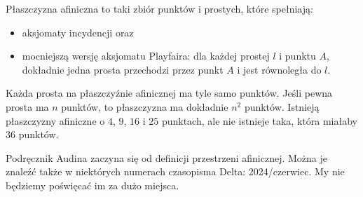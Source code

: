\begin{proposition}
    Płaszczyzna afiniczna to taki zbiór punktów i prostych, które spełniają: 
    \begin{itemize}
        \item aksjomaty incydencji oraz
        \item mocniejszą wersję aksjomatu Playfaira: dla każdej prostej $l$ i punktu $A$, dokładnie jedna prosta przechodzi przez punkt $A$ i jest równoległa do $l$.
    \end{itemize}
    Każda prosta na płaszczyźnie afinicznej ma tyle samo punktów.
    Jeśli pewna prosta ma $n$ punktów, to płaszczyzna ma dokładnie $n^2$ punktów.
    Istnieją płaszczyzny afiniczne o $4$, $9$, $16$ i $25$ punktach, ale nie istnieje taka, która miałaby $36$ punktów.
\end{proposition} %

Podręcznik Audina \cite[s. 7]{audin_2003} zaczyna się od definicji przestrzeni afinicznej.
Można je znaleźć także w niektórych numerach czasopisma Delta: 2024/czerwiec.
My nie będziemy poświęcać im za dużo miejsca.

%